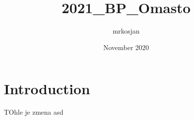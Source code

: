 \documentclass{article}
\title{2021_BP_Omasto}
\author{mrkosjan }
\date{November 2020}
\begin{document}
\maketitle

\section{Introduction}


    TOhle je zmena asd
\end{document}

